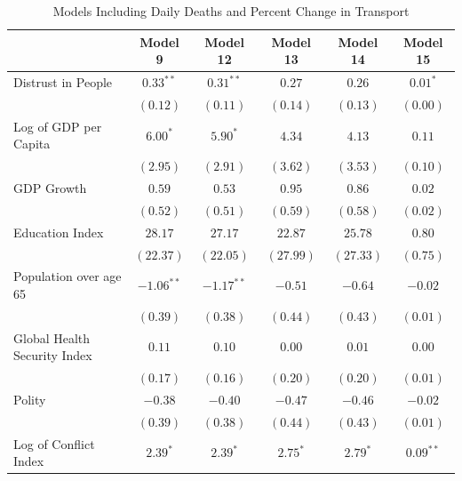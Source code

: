 \documentclass[
  12pt,
]{article}
\begin{document}
\begin{table}
\caption{Models Including Daily Deaths and Percent Change in Transport}
\begin{center}
\begin{small}
\begin{tabular}{l c c c c c}
\hline
 & Model 9 & Model 12 & Model 13 & Model 14 & Model 15 \\
\hline
Distrust in People                & $0.33^{**}$  & $0.31^{**}$  & $0.27$        & $0.26$        & $0.01^{*}$    \\
                                  & $(0.12)$     & $(0.11)$     & $(0.14)$      & $(0.13)$      & $(0.00)$      \\
Log of GDP per Capita             & $6.00^{*}$   & $5.90^{*}$   & $4.34$        & $4.13$        & $0.11$        \\
                                  & $(2.95)$     & $(2.91)$     & $(3.62)$      & $(3.53)$      & $(0.10)$      \\
GDP Growth                        & $0.59$       & $0.53$       & $0.95$        & $0.86$        & $0.02$        \\
                                  & $(0.52)$     & $(0.51)$     & $(0.59)$      & $(0.58)$      & $(0.02)$      \\
Education Index                   & $28.17$      & $27.17$      & $22.87$       & $25.78$       & $0.80$        \\
                                  & $(22.37)$    & $(22.05)$    & $(27.99)$     & $(27.33)$     & $(0.75)$      \\
Population over age 65            & $-1.06^{**}$ & $-1.17^{**}$ & $-0.51$       & $-0.64$       & $-0.02$       \\
                                  & $(0.39)$     & $(0.38)$     & $(0.44)$      & $(0.43)$      & $(0.01)$      \\
Global Health Security Index      & $0.11$       & $0.10$       & $0.00$        & $0.01$        & $0.00$        \\
                                  & $(0.17)$     & $(0.16)$     & $(0.20)$      & $(0.20)$      & $(0.01)$      \\
Polity                            & $-0.38$      & $-0.40$      & $-0.47$       & $-0.46$       & $-0.02$       \\
                                  & $(0.39)$     & $(0.38)$     & $(0.44)$      & $(0.43)$      & $(0.01)$      \\
Log of Conflict Index             & $2.39^{*}$   & $2.39^{*}$   & $2.75^{*}$    & $2.79^{*}$    & $0.09^{**}$   \\

\end{tabular}
\end{small}
\end{center}
\end{table}
\end{document}
